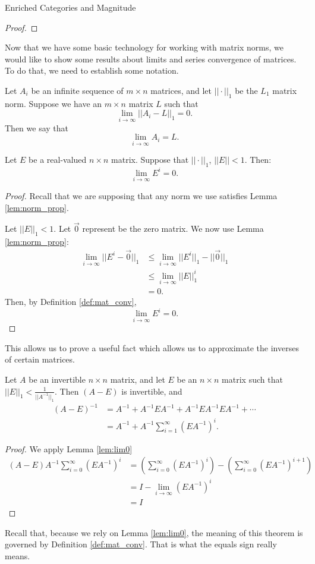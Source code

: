\documentclass[12pt]{pom_thesis}
\begin{document}
\begin{chapter}{Enriched Categories and Magnitude}
\begin{proof}
\end{proof}

Now that we have some basic technology for working with matrix norms, we would like to show some results about limits and series convergence of matrices. To do that, we need to establish some notation. 
\begin{defn}\label{def:mat_conv}
Let $A_i$ be an infinite sequence of $m \times n$ matrices, and let $||\cdot||_1$ be the $L_1$ matrix norm. Suppose we have an $m \times n$ matrix $L$ such that 
\[
\lim_{i \rightarrow \infty} ||A_i - L||_1 = 0.
\]
Then we say that 
\[
\lim_{i \rightarrow \infty} A_i = L.
\]
\end{defn}
\begin{lemma}\label{lem:lim0}
Let $E$ be a real-valued $n \times n$ matrix. Suppose that $||\cdot||_1$, $||E|| < 1$. Then:
\[
\lim_{i \rightarrow \infty}E^i = 0.
\]
\end{lemma}
\begin{proof}
Recall that we are supposing that any norm we use satisfies Lemma \ref{lem:norm_prop}.

Let $||E||_1 < 1$. Let $\vec{0}$ represent be the zero matrix. We now use Lemma \ref{lem:norm_prop}:
\begin{align*}
\lim_{i \rightarrow \infty}|| E^i - \vec{0}||_1 &\leq \lim_{i \rightarrow \infty}|| E^i||_1 - ||\vec{0}||_1 \\
&\leq \lim_{i \rightarrow \infty}|| E||_1^i\\
&= 0.
\end{align*}
Then, by Definition \ref{def:mat_conv},
\[
\lim_{i \rightarrow \infty} E^i = 0.
\]
\end{proof}

This allows us to prove a useful fact which allows us to approximate the inverses of certain matrices.
\begin{thm}\label{thm:approx}
Let $A$ be an invertible $n \times n$ matrix, and let $E$ be an $n \times n$ matrix such that $||E||_1 < \frac 1{||A^{-1}||_1}$. Then $(A-E)$ is invertible, and
\begin{align*}
(A - E)^{-1} &= A^{-1} + A^{-1}EA^{-1} + A^{-1}EA^{-1}EA^{-1} + \cdots\\
&= A^{-1} + A^{-1}\sum_{i = 1}^\infty (EA^{-1})^i.
\end{align*}
\end{thm}
\begin{proof}
We apply Lemma \ref{lem:lim0}
\begin{align*}
(A-E)  A^{-1}\sum_{i = 0}^\infty (EA^{-1})^i
&= \left(\sum_{i = 0}^\infty (EA^{-1})^i\right) - \left( \sum_{i = 0}^\infty (EA^{-1})^{i+1}\right)\\
&= I - \lim_{i \rightarrow \infty} (EA^{-1})^i\\
&= I
\end{align*}
\end{proof}
\begin{rmk}
Recall that, because we rely on Lemma \ref{lem:lim0}, the meaning of this theorem is governed by Definition \ref{def:mat_conv}. That is what the equals sign really means. 
\end{rmk}


\end{chapter}
\end{document}
